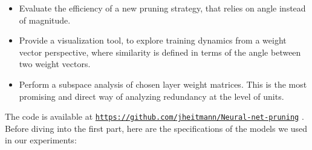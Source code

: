 \begin{itemize}
\item Evaluate the efficiency of a new pruning strategy, that relies on angle instead of magnitude.
\item Provide a visualization tool, to explore training dynamics from a weight vector perspective, where similarity is defined in terms of the angle between two weight vectors.  
\item Perform a subspace analysis of chosen layer weight matrices. This is the most promising and direct way of analyzing redundancy at the level of units.
\end{itemize}

The code is available at \href{https://github.com/jheitmann/Neural-net-pruning}{\texttt{https://github.com/jheitmann/Neural-net-pruning}} . Before diving into the first part, here are the specifications of the models we used in our experiments:

